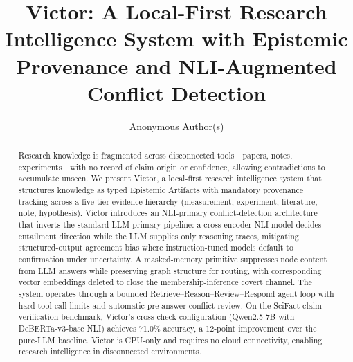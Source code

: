 \documentclass[letterpaper]{article} %
\title{Victor: A Local-First Research Intelligence System with Epistemic Provenance and NLI-Augmented Conflict Detection}
\author{
    Anonymous Author(s)
}
\begin{document}
\maketitle

\begin{abstract}
Research knowledge is fragmented across disconnected tools---papers, notes, experiments---with no record of claim origin or confidence, allowing contradictions to accumulate unseen. We present Victor, a local-first research intelligence system that structures knowledge as typed Epistemic Artifacts with mandatory provenance tracking across a five-tier evidence hierarchy (measurement, experiment, literature, note, hypothesis). Victor introduces an NLI-primary conflict-detection architecture that inverts the standard LLM-primary pipeline: a cross-encoder NLI model decides entailment direction while the LLM supplies only reasoning traces, mitigating structured-output agreement bias where instruction-tuned models default to confirmation under uncertainty. A masked-memory primitive suppresses node content from LLM answers while preserving graph structure for routing, with corresponding vector embeddings deleted to close the membership-inference covert channel. The system operates through a bounded Retrieve--Reason--Review--Respond agent loop with hard tool-call limits and automatic pre-answer conflict review. On the SciFact claim verification benchmark, Victor's cross-check configuration (Qwen2.5-7B with DeBERTa-v3-base NLI) achieves 71.0\% accuracy, a 12-point improvement over the pure-LLM baseline. Victor is CPU-only and requires no cloud connectivity, enabling research intelligence in disconnected environments.
\end{abstract}
\end{document}

